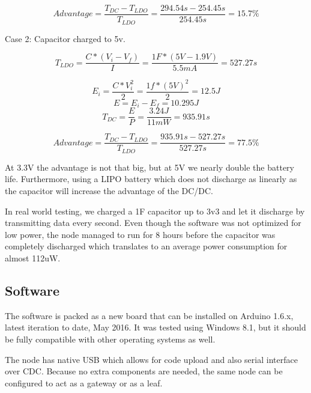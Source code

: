 $$Advantage = \frac{T_{DC} - T_{LDO}}{T_{LDO}} = \frac{294.54s - 254.45s}{254.45s} = 15.7\%$$

Case 2: Capacitor charged to 5v.

$$T_{LDO} = \frac{C * (V_i - V_f)}{I}=\frac{1F * (5V - 1.9V)}{5.5mA} = 527.27s $$

$$E_i = \frac{C*V_i^2}{2} = \frac{1f*(5V)^2}{2} =12.5J$$
$$E = E_i - E_f = 10.295J$$
$$T_{DC} = \frac{E}{P} = \frac{3.24J}{11mW} =935.91s $$

$$Advantage = \frac{T_{DC} - T_{LDO}}{T_{LDO}} = \frac{935.91s - 527.27s}{527.27s} = 77.5\%$$

At 3.3V the advantage is not that big, but at 5V we nearly double the battery life. Furthermore, using a LIPO
battery which does not discharge as linearly as the capacitor will increase the
advantage of the DC/DC.

In real world testing, we charged a 1F capacitor up to 3v3 and let it discharge by transmitting data every second. Even though the software was not
optimized for low power, the node managed to run for 8 hours before the capacitor was completely
discharged which translates to an average power consumption for almost 112uW.


\subsection{Software}

The software is packed as a new board that can be installed on Arduino 1.6.x, latest iteration to date,
May 2016. It was tested using Windows 8.1, but it should be fully compatible with other operating systems as well.

The node has native USB which allows for code upload and also serial interface over CDC. Because no
extra components are needed, the same node can be configured to act as a gateway or
as a leaf.
